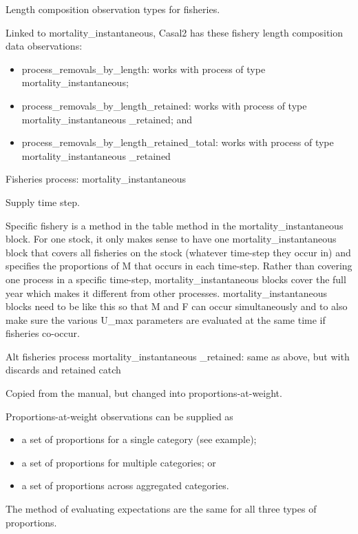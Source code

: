 \documentclass[a4paper,11pt,twoside,pdftex,draft]{article}
\begin{document}
Length composition observation types for fisheries.


Linked to mortality\_instantaneous, Casal2 has these fishery length composition data observations:

\begin{itemize}
	\item process\_removals\_by\_length: works with process of type mortality\_instantaneous;
	\item process\_removals\_by\_length\_retained: works with process of type mortality\_instantaneous \_retained; and
	\item process\_removals\_by\_length\_retained\_total: works with process of type mortality\_instantaneous \_retained
\end{itemize}

Fisheries process: mortality\_instantaneous

Supply time step.

Specific fishery is a method in the table method in the  mortality\_instantaneous block. For one stock, it only makes sense to have one mortality\_instantaneous block that covers all fisheries on the stock (whatever time-step they occur in) and specifies the proportions of M that occurs in each time-step. Rather than covering one process in a specific time-step, mortality\_instantaneous blocks cover the full year which makes it different from other processes. mortality\_instantaneous blocks need to be like this so that M and F can occur simultaneously and to also make sure the various U\_max parameters are evaluated at the same time if fisheries co-occur.

Alt fisheries process mortality\_instantaneous \_retained:  same as above, but with discards and retained catch

Copied from the manual, but changed into proportions-at-weight.

Proportions-at-weight observations can be supplied as

\begin{itemize}
	\item a set of proportions for a single category (see example);
	\item a set of proportions for multiple categories; or
	\item a set of proportions across aggregated categories.
\end{itemize}

The method of evaluating expectations are the same for all three types of proportions.
\end{document}
